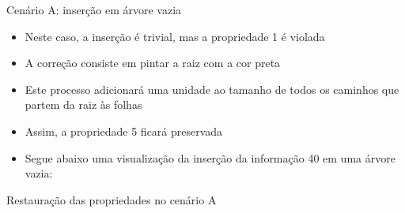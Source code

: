 \begin{frame}[fragile]{Cenário A: inserção em árvore vazia}

    \begin{itemize}
        \item Neste caso, a inserção é trivial, mas a propriedade 1 é violada

        \item A correção consiste em pintar a raiz com a cor preta

        \item Este processo adicionará uma unidade ao tamanho de todos os caminhos que 
            partem da raiz às folhas

        \item Assim, a propriedade 5 ficará preservada

        \item Segue abaixo uma visualização da inserção da informação 40 em uma árvore vazia:
    \end{itemize}

    \begin{figure}
    \centering
    \end{figure}

\end{frame}

\begin{frame}[fragile]{Restauração das propriedades no cenário A}
\end{frame}

